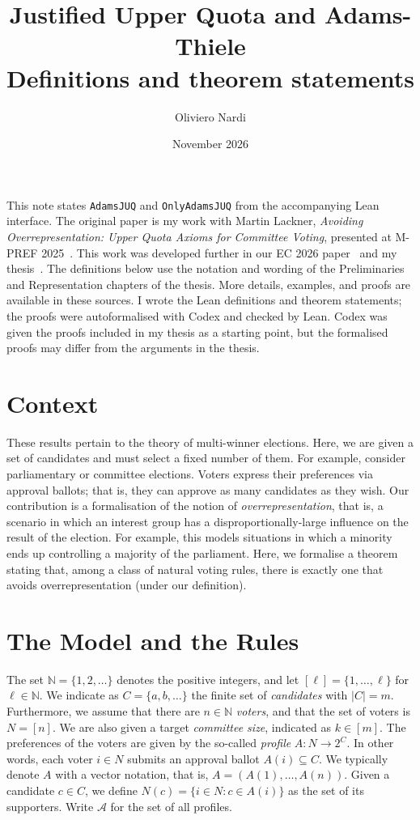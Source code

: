 \documentclass[11pt,a4paper]{article}
\title{Justified Upper Quota and Adams-Thiele\\[3pt]
  \large Definitions and theorem statements}
\author{Oliviero Nardi}
\date{November 2026}
\newcommand{\voters}{N}
\newcommand{\candidates}{C}
\newcommand{\approfile}{A}
\newcommand{\app}[1]{A(#1)}
\newcommand{\profiles}{\mathcal A}
\newcommand{\num}{\ell}
\newcommand{\nats}{\mathbb N}
\newcommand{\vect}[1]{\left(#1\right)}
\newcommand{\powerset}[1]{2^{#1}}
\begin{document}
\maketitle
\vspace{-1em}
This note states \texttt{AdamsJUQ} and \texttt{OnlyAdamsJUQ} from the
accompanying Lean interface.
The original paper is my work with Martin Lackner, \emph{Avoiding
Overrepresentation: Upper Quota Axioms for Committee Voting}, presented at
M-PREF 2025~\cite{lacknernardi2025}. This work was developed further in our
EC 2026 paper~\cite{baychkov2026} and my thesis~\cite{nardi2026}.
The definitions below use the notation and wording of the Preliminaries and
Representation chapters of the thesis. More details, examples, and proofs
are available in these sources.
I wrote the Lean definitions and theorem statements; the proofs were
autoformalised with Codex and checked by Lean.
Codex was given the proofs included in my thesis as a starting point,
but the formalised proofs may differ from the arguments in the thesis.

\section{Context}

These results pertain to the theory of multi-winner elections.
Here, we are given a set of candidates and must select a fixed number of them.
For example, consider parliamentary or committee elections. Voters express their preferences
via approval ballots; that is, they can approve as many candidates as they wish. 
Our contribution is a formalisation of the notion of \emph{overrepresentation}, that is,
a scenario in which an interest group has a disproportionally-large influence on the result of the election.
For example, this models situations in which a minority ends up controlling a majority of the parliament.
Here, we formalise a theorem stating that, among a class of natural voting rules,
there is exactly one that avoids overrepresentation (under our definition).

\section{The Model and the Rules}
The set $\nats=\{1,2,\ldots\}$ denotes the positive integers, and let
$[\num]=\{1,\ldots,\num\}$ for $\num\in\nats$.
We indicate as $\candidates=\{a,b,\ldots\}$ the finite set of
\emph{candidates} with $|\candidates|=m$. Furthermore, we assume that there
are $n\in\nats$ \emph{voters}, and that the set of voters is $\voters=[n]$.
We are also given a target \emph{committee size}, indicated as $k\in[m]$.
The preferences of the voters are given by the so-called \emph{profile}
$\approfile\colon\voters\to\powerset{\candidates}$. In other words, each
voter $i\in\voters$ submits an approval ballot $\approfile(i)\subseteq\candidates$.
We typically denote
$\approfile$ with a vector notation, that is,
$\approfile=\vect{\app{1},\ldots,\app{n}}$.
Given a candidate $c\in\candidates$, we define
$\voters(c)=\{i\in\voters:c\in\app{i}\}$ as the set of its supporters.
Write $\profiles$ for the set of all profiles.
\end{document}

